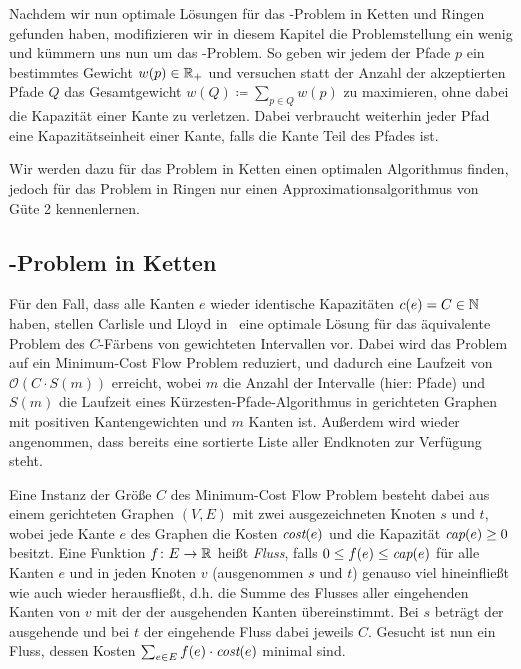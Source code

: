 Nachdem wir nun optimale Lösungen für das \CallControl-Problem in Ketten und Ringen gefunden haben, modifizieren
wir in diesem Kapitel die Problemstellung ein wenig und kümmern uns nun um das \WeightedCallControl-Problem.
So geben wir jedem der Pfade $p$ ein bestimmtes Gewicht $w(p) \in \mathbb R_+$ und versuchen statt der
Anzahl der akzeptierten Pfade $Q$ das Gesamtgewicht $w(Q) \coloneqq \sum_{p\in Q}w(p)$ zu maximieren, ohne
dabei die Kapazität einer Kante zu verletzen.
Dabei verbraucht weiterhin jeder Pfad eine Kapazitätseinheit einer Kante, falls die Kante Teil des Pfades ist.

Wir werden dazu für das Problem in Ketten einen optimalen Algorithmus finden, jedoch für das Problem in Ringen
nur einen Approximationsalgorithmus von Güte 2 kennenlernen.

\subsection{\WeightedCallControl-Problem in Ketten}\label{subsec:weighted-call-control-in-chains}
Für den Fall, dass alle Kanten $e$ wieder identische Kapazitäten $c(e) = C \in \mathbb N$ haben, stellen Carlisle und Lloyd
in~\cite{carlisle} eine optimale Lösung für das äquivalente Problem des $C$-Färbens von gewichteten Intervallen vor.
Dabei wird das Problem auf ein Minimum-Cost Flow Problem reduziert, und dadurch eine Laufzeit von $\mathcal O(C\cdot S(m))$
erreicht, wobei $m$ die Anzahl der Intervalle (hier: Pfade) und $S(m)$ die Laufzeit eines Kürzesten-Pfade-Algorithmus
in gerichteten Graphen mit positiven Kantengewichten und $m$ Kanten ist.
Außerdem wird wieder angenommen, dass bereits eine sortierte Liste aller Endknoten zur Verfügung steht.

Eine Instanz der Größe $C$ des Minimum-Cost Flow Problem besteht dabei aus einem gerichteten Graphen $(V,E)$ mit zwei
ausgezeichneten Knoten $s$ und $t$, wobei jede Kante $e$ des Graphen die Kosten $\text{\em cost}(e)$ und die Kapazität
$\text{\em cap}(e) \geq 0$ besitzt.
Eine Funktion $f\colon E \rightarrow \mathbb R$ heißt {\em Fluss}, falls $0 \leq f(e) \leq \text{\em cap}(e)$ für alle
Kanten $e$ und in jeden Knoten $v$ (ausgenommen $s$ und $t$) genauso viel hineinfließt wie auch wieder herausfließt, d.h.
die Summe des Flusses aller eingehenden Kanten von $v$ mit der der ausgehenden Kanten übereinstimmt.
Bei $s$ beträgt der ausgehende und bei $t$ der eingehende Fluss dabei jeweils $C$.
Gesucht ist nun ein Fluss, dessen Kosten $\sum_{e\in E}f(e) \cdot \text{\em cost}(e)$ minimal sind.

